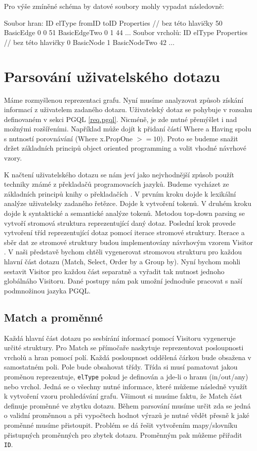 Pro výše zmíněné schéma by datové soubory mohly vypadat následovně:
\begin{code}
Soubor hran:
ID elType fromID toID Properties // bez této hlavičky
50 BasicEdge 0 0 
51 BasicEdgeTwo 0 1 44
...
Soubor vrcholů:
ID elType Properties // bez této hlavičky
0 BasicNode
1 BasicNodeTwo 42
...
\end{code}

\section{Parsování uživatelského dotazu}

Máme rozmyšlenou reprezentaci grafu.
Nyní musíme analyzovat způsob získání informací z uživatelem zadaného dotazu.
Uživatelský dotaz se pohybuje v rozsahu definovaném v sekci PGQL \ref{req.pgql}.
Nicméně, je zde nutné přemýšlet i nad možnými rozšířeními.
Například může dojít k přidaní částí Where a Having spolu s nutností porovnávání (Where x.PropOne $>= 10$).
Proto se budeme snažit držet základních principů object oriented programming a volit vhodné návrhové vzory.

K načtení uživatelského dotazu se nám jeví jako nejvhodnější způsob použít techniky známé z překladačů programovacích jazyků.
Budeme vycházet ze základních principů knihy o překladačích \citep{dragoonBook}.
V prvním kroku dojde k lexikální analýze uživatelsky zadaného řetězce.
Dojde k vytvoření tokenů.
V druhém kroku dojde k syntaktické a semantické analýze tokenů.
Metodou top-down parsing \citep[str. 217]{dragoonBook} se vytvoří stromová struktura reprezentující daný dotaz.
Poslední krok provede vytvoření tříd reprezentující dotaz pomocí iterace stromové struktury.
Iterace a sběr dat ze stromové struktury budou implementovány návrhovým vzorem Visitor \citep[str. 331]{patterns}.
V naši představě bychom chtěli vygenerovat stromovou strukturu pro každou hlavní část dotazu (Match, Select, Order by a Group by).
Nyní bychom mohli sestavit Visitor pro každou část separatně a vyřadit tak nutnost jednoho globálnáho Visitoru.
Dané postupy nám pak umožní jednoduše pracovat s naší podmnožinou jazyka PGQL.


\subsection{Match a proměnné} \label{anal.mathcandvar}

Každá hlavní část dotazu po sesbírání informací pomocí Visitoru vygeneruje určité struktury.
Pro Match se přímočaře naskytuje reprezentovat posloupnosti vrcholů a hran pomocí polí.
Každá posloupnost oddělená čárkou bude obsažena v samostatném poli.
Pole bude obsahovat třídy.
Třída si musí pamatovat jakou proměnou reprezentuje, \verb+elType+ pokud je definován a jde-li o hranu (in/out/any) nebo vrchol.
Jedná se o všechny nutné informace, které můžeme následně využít k vytvoření vzoru prohledávání grafu.
Všimout si musíme faktu, že Match část definuje proměnné ve zbytku dotazu.
Během parsování musíme určit zda se jedná o validní proměnnou a při vypočtech hodnot výrazů je nutné vědět přesně k jaké proměnné musíme přistoupit.
Problém se dá řešit vytvořením mapy/slovníku přistupných proměnných pro zbytek dotazu.
Proměnným pak můžeme přiřadit \verb+ID+.

